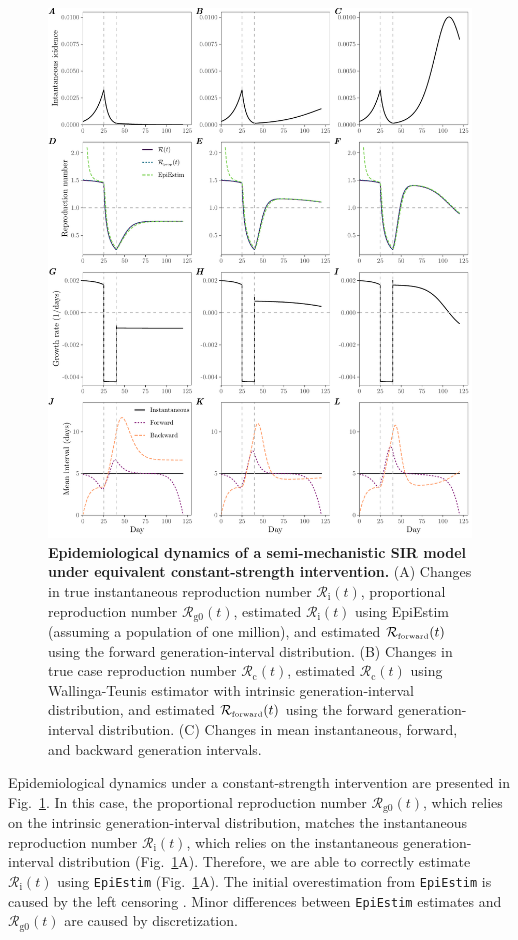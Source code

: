 \documentclass[12pt]{article}
\newcommand{\fref}[1]{Fig.~\ref{fig:#1}}
\newcommand{\Rx}[1]{\ensuremath{{\mathcal R}_{#1}}\xspace}
\newcommand{\Rc}{\Rx{\mathrm{c}}}
\newcommand{\Ri}{\Rx{\mathrm{i}}}
\newcommand{\RR}{\ensuremath{{\mathcal R}}\xspace}
\newcommand{\Rcori}{\Rx{\mathrm{g0}}}
\newcommand{\tsub}[2]{#1_{{\textrm{\tiny #2}}}}
\begin{document}
\begin{figure}[!th]
\includegraphics[width=\textwidth]{figure_sir_beta.pdf}
\caption{
\textbf{Epidemiological dynamics of a semi-mechanistic SIR model under equivalent constant-strength intervention.}
(A) Changes in true instantaneous reproduction number $\Ri(t)$, proportional reproduction number $\Rcori(t)$, estimated $\Ri(t)$ using EpiEstim (assuming a population of one million), and estimated $\tsub{\RR}{forward}(t)$ using the forward generation-interval distribution.
(B) Changes in true case reproduction number $\Rc(t)$, estimated $\Rc(t)$ using Wallinga-Teunis estimator with intrinsic generation-interval distribution, and estimated $\tsub{\RR}{forward}(t)$ using the forward generation-interval distribution.
(C) Changes in mean instantaneous, forward, and backward generation intervals.
}
\label{fig:sir_beta}
\end{figure}

Epidemiological dynamics under a constant-strength intervention are presented in \fref{sir_beta}.
In this case, the proportional reproduction number $\Rcori(t)$, which relies on the intrinsic generation-interval distribution, matches the instantaneous reproduction number $\Ri(t)$, which relies on the instantaneous generation-interval distribution (\fref{sir_beta}A).
Therefore, we are able to correctly estimate $\Ri(t)$ using \texttt{EpiEstim} (\fref{sir_beta}A).
The initial overestimation from \texttt{EpiEstim} is caused by the left censoring \citep{gostic2020practical}.
Minor differences between \texttt{EpiEstim} estimates and $\Rcori(t)$ are caused by discretization.
\end{document}
